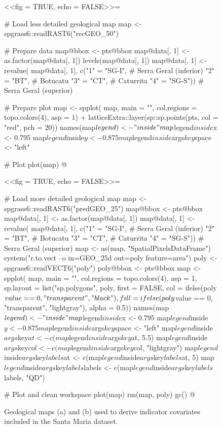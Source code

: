 \begin{figure}[!ht]
 \centering
 \begin{minipage}[b]{63mm}
  \subcaption{}
  \centering
  <<fig = TRUE, echo = FALSE>>=
   
   # Load less detailed geological map
   map <- spgrass6::readRAST6("recGEO_50")
   
   # Prepare data
   map@bbox <- pts@bbox
   map@data[, 1] <- as.factor(map@data[, 1])
   levels(map@data[, 1])
   map@data[, 1] <- revalue(
     map@data[, 1], c("1" = "SG-I",  # Serra Geral (inferior)
                      "2" = "BT",    # Botucatu
                      "3" = "CT",    # Caturrita
                      "4" = "SG-S")) # Serra Geral (superior)
   
   # Prepare plot
   map <- spplot(
     map, main = "", col.regions = topo.colors(4), asp = 1) +
     latticeExtra::layer(sp::sp.points(pts, col = "red", pch = 20))
   names(map$legend) <- "inside"
   map$legend$inside$x <- 0.795
   map$legend$inside$y <- 0.875
   map$legend$inside$args$key$space <- "left"
   
   # Plot
   plot(map)
  @
 \end{minipage}
 
 \begin{minipage}[b]{63mm}
  \subcaption{}
  \centering
  <<fig = TRUE, echo = FALSE>>=
   
   # Load more detailed geological map
   map <- spgrass6::readRAST6("predGEO_25")
   map@bbox <- pts@bbox
   map@data[, 1] <- as.factor(map@data[, 1])
   map@data[, 1] <- revalue(
     map@data[, 1], c("1" = "SG-I",  # Serra Geral (inferior)
                      "2" = "BT",    # Botucatu
                      "3" = "CT",    # Caturrita
                      "4" = "SG-S")) # Serra Geral (superior)
   map <- as(map, "SpatialPixelsDataFrame")
   system("r.to.vect --o in=GEO_25d out=poly feature=area")
   poly <- spgrass6::readVECT6("poly")
   poly@bbox <- pts@bbox
   map <- spplot(
     map, main = "", col.regions = topo.colors(4), asp = 1, 
     sp.layout = list("sp.polygons", poly, first = FALSE, 
     col = ifelse(poly$value == 0, "transparent", " black"), 
     fill = ifelse(poly$value == 0, "transparent", "lightgray"), alpha = 0.5))
   names(map$legend) <- "inside"
   map$legend$inside$x <- 0.795
   map$legend$inside$y <- 0.875
   map$legend$inside$args$key$space <- "left"
   map$legend$inside$args$key$at <- c(map$legend$inside$args$key$at, 5.5)
   map$legend$inside$args$key$col <- c(map$legend$inside$args$key$col, "lightgray")
   map$legend$inside$args$key$labels$at <- c(map$legend$inside$args$key$labels$at, 5)
   map$legend$inside$args$key$labels$labels <- c(map$legend$inside$args$key$labels$labels, "QD")
   
   # Plot and clean workspace
   plot(map)
   rm(map, poly)
   gc()
  @
 \end{minipage} 
 \caption{Geological maps (a) \geoOld{} and (b) \geoNew{} used to derive indicator covariates included in the 
 Santa Maria dataset.}
\label{fig:covar-data-geo-maps}
\end{figure}

